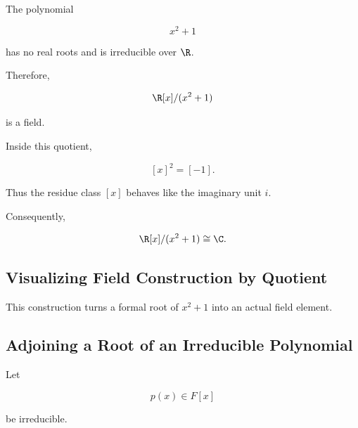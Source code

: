 The polynomial

\[ x^2+1 \]

has no real roots and is irreducible over \(\R\).

Therefore,

\[ \R[x]/(x^2+1) \]

is a field.

Inside this quotient,

\[ [x]^2=[-1]. \]

Thus the residue class \([x]\) behaves like the imaginary unit \(i\).

Consequently,

\[ \R[x]/(x^2+1)\cong\C. \]

\subsection{Visualizing Field Construction by Quotient}
\label{subsec:visual-field-quotient-construction}

\begin{center}
\end{center}

This construction turns a formal root of \(x^2+1\) into an actual field
element.

\subsection{Adjoining a Root of an Irreducible Polynomial}
\label{subsec:adjoining-irreducible-root}

Let

\[ p(x)\in F[x] \]

be irreducible.

